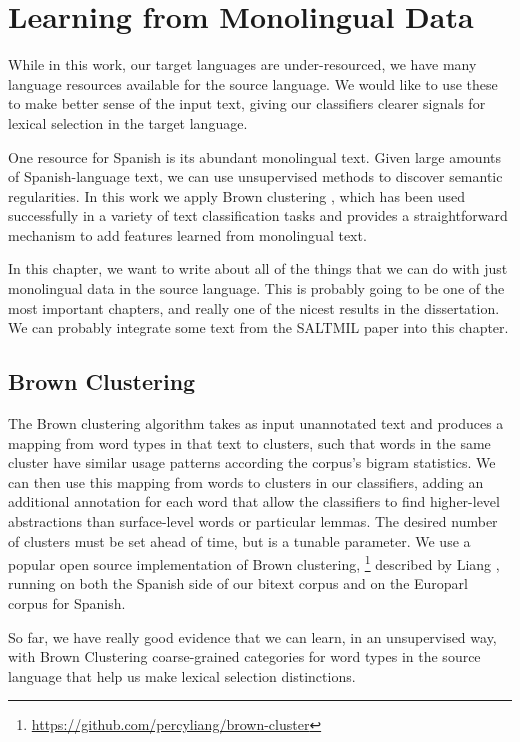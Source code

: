 \chapter{Learning from Monolingual Data}
\label{chap:monolingual}
While in this work, our target languages are under-resourced, we have many
language resources available for the source language. We would like to use
these to make better sense of the input text, giving our classifiers clearer
signals for lexical selection in the target language.

One resource for Spanish is its abundant monolingual text. Given
large amounts of Spanish-language text, we can use unsupervised methods to
discover semantic regularities. In this work we apply Brown clustering
\cite{brown1992class}, which has been used successfully in a variety
of text classification tasks \cite{turian-ratinov-bengio:2010:ACL} and provides
a straightforward mechanism to add features learned from monolingual text.

In this chapter, we want to write about all of the things that we can do with
just monolingual data in the source language.
This is probably going to be one of the most important chapters, and really one
of the nicest results in the dissertation.
We can probably integrate some text from the SALTMIL paper into this chapter.



\section{Brown Clustering}
The Brown clustering algorithm takes as input unannotated text and produces a
mapping from word types in that text to clusters, such that words in the same
cluster have similar usage patterns according the corpus's bigram statistics.
We can then use this mapping from words to clusters in our classifiers, adding
an additional annotation for each word that allow the classifiers to find
higher-level abstractions than surface-level words or particular lemmas.
The desired number of clusters must be set ahead of time, but is a tunable
parameter.
We use a popular open source implementation of Brown clustering,
\footnote{\url{https://github.com/percyliang/brown-cluster}} described by
Liang \cite{Liang05semi-supervisedlearning}, running on both the Spanish
side of our bitext corpus and on the Europarl corpus \cite{europarl} for
Spanish.


So far, we have really good evidence that we can learn, in an unsupervised way,
with Brown Clustering 
coarse-grained categories for word types in the source language that help us
make lexical selection distinctions.

